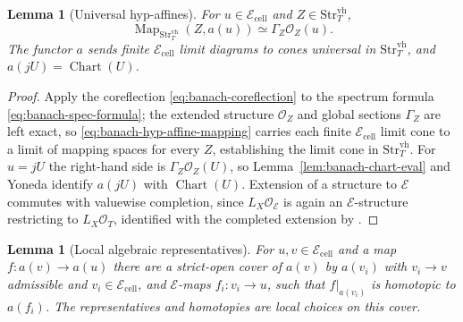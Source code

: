 \documentclass[12pt]{amsart}
\newtheorem{lem}[thm]{Lemma}
\theoremstyle{definition}
\theoremstyle{remark}
\numberwithin{equation}{section}
\newcommand{\E}{\mathcal E}
\DeclareMathOperator{\Map}{Map}
\begin{document}
\begin{lem}[Universal hyp-affines]
\label{lem:banach-hyp-affine-mapping}
For $u\in\E_{\mathrm{cell}}$ and
$Z\in\mathrm{Str}_T^{\mathrm{vh}}$,
\begin{equation}
\label{eq:banach-hyp-affine-mapping}
 \Map_{\mathrm{Str}_T^{\mathrm{vh}}}(Z,a(u))
 \simeq\Gamma_Z\mathcal O_Z(u).
\end{equation}
The functor $a$ sends finite $\E_{\mathrm{cell}}$ limit diagrams to
cones universal in $\mathrm{Str}_T^{\mathrm{vh}}$, and
$a(jU)=\operatorname{Chart}(U)$.
\end{lem}

\begin{proof}
Apply the coreflection \eqref{eq:banach-coreflection} to the
spectrum formula \eqref{eq:banach-spec-formula}; the extended
structure $\mathcal O_Z$ and global sections $\Gamma_Z$ are left
exact, so \eqref{eq:banach-hyp-affine-mapping} carries each finite
$\E_{\mathrm{cell}}$ limit cone to a limit of mapping spaces for
every $Z$, establishing the limit cone in
$\mathrm{Str}_T^{\mathrm{vh}}$. For $u=jU$ the right-hand
side is $\Gamma_Z\mathcal O_Z(U)$, so
Lemma~\ref{lem:banach-chart-eval} and Yoneda identify $a(jU)$ with
$\operatorname{Chart}(U)$. Extension of a structure to $\E$ commutes
with valuewise completion, since $L_X\mathcal O_{\E}$ is again an
$\E$-structure restricting to $L_X\mathcal O_T$, identified with the
completed extension by \cite[Proposition~3.4.5,
pp.~97--98]{LurieDAGV2009}.
\end{proof}

\begin{lem}[Local algebraic representatives]
\label{lem:banach-local-representative}
For $u,v\in\E_{\mathrm{cell}}$ and a map
$f\colon a(v)\to a(u)$ there are a strict-open cover of $a(v)$ by
$a(v_i)$ with $v_i\to v$ admissible and $v_i\in\E_{\mathrm{cell}}$,
and $\E$-maps $f_i\colon v_i\to u$, such that $f|_{a(v_i)}$ is
homotopic to $a(f_i)$. The representatives and homotopies
are local choices on this cover.
\end{lem}
\end{document}
